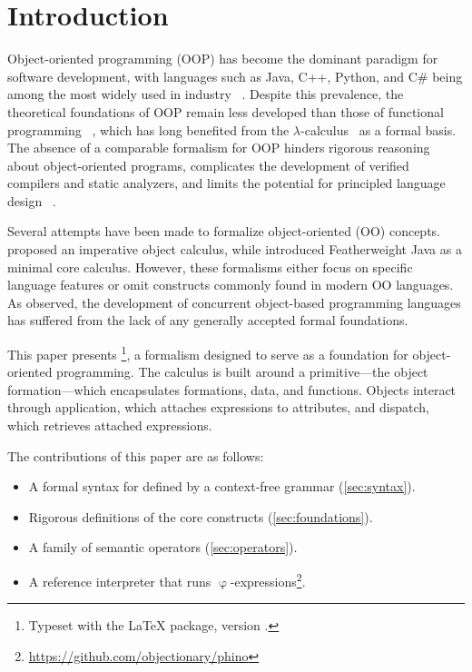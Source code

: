 
\section{Introduction}

Object-oriented programming (OOP) has become
  the dominant paradigm for software development,
  with languages such as Java, C++, Python, and C\#
  being among the most widely used in industry%
  ~\citep{madsen1988object,nierstrasz1989survey,korson1990understanding,booch1994object,meyer1997object,west2004object}.
Despite this prevalence, the theoretical foundations of OOP remain
  less developed than those of functional programming%
  ~\citep{rentsch1982object,madsen1988object},
  which has long benefited from the
  \(\lambda\)-calculus~\citep{church1936some,barendregt2012} as a formal basis.
The absence of a comparable formalism for OOP hinders rigorous reasoning
  about object-oriented programs,
  complicates the development of verified compilers and static analyzers,
  and limits the potential for principled language design%
  ~\citep{eden2001principles}.

Several attempts have been made to formalize object-oriented (OO) concepts.
\citet{abadi1995imperative} proposed an imperative object calculus,
  while \citet{igarashi2001featherweight} introduced Featherweight
  Java as a minimal core calculus.
However, these formalisms either focus on specific language features
  or omit constructs commonly found in modern OO languages.
As \citet{nierstrasz1991towards} observed, the development
  of concurrent object-based programming languages
  has suffered from the lack of any generally accepted formal foundations.

This paper presents \phic{}%
  \footnote{Typeset with the  \LaTeX{} package, version \ff{\eolangversion}.},
  a formalism designed to serve
  as a foundation for object-oriented programming.
The calculus is built around a primitive---the object formation---which
  encapsulates formations, data, and functions.
Objects interact through application, which attaches expressions to attributes,
  and dispatch, which retrieves attached expressions.

The contributions of this paper are as follows:
\begin{itemize}
  \item A formal syntax for \phic{} defined
  by a context-free grammar (\cref{sec:syntax}).
  \item Rigorous definitions of the core constructs (\cref{sec:foundations}).
  \item A family of semantic operators (\cref{sec:operators}).
  \item A reference interpreter that runs
  \(\upvarphi\)-expressions\footnote{\url{https://github.com/objectionary/phino}}.
\end{itemize}


